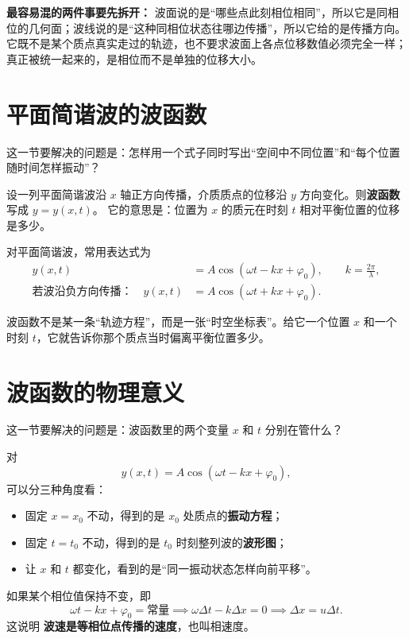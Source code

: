 \documentclass[lang=cn,11pt]{elegantbook}
\newcommand{\bridge}[1]{\begin{note}#1\end{note}}
\begin{document}
\begin{note}
\textbf{最容易混的两件事要先拆开：} 波面说的是“哪些点此刻相位相同”，所以它是同相位的几何面；波线说的是“这种同相位状态往哪边传播”，所以它给的是传播方向。它既不是某个质点真实走过的轨迹，也不要求波面上各点位移数值必须完全一样；真正被统一起来的，是相位而不是单独的位移大小。
\end{note}

\section{平面简谐波的波函数}

这一节要解决的问题是：怎样用一个式子同时写出“空间中不同位置”和“每个位置随时间怎样振动”？

设一列平面简谐波沿 \(x\) 轴正方向传播，介质质点的位移沿 \(y\) 方向变化。则\textbf{波函数}写成 \(y=y(x,t)\)。
它的意思是：位置为 \(x\) 的质元在时刻 \(t\) 相对平衡位置的位移是多少。

对平面简谐波，常用表达式为
\[
\begin{aligned}
y(x,t)&=A\cos(\omega t-kx+\varphi_0),\qquad k=\frac{2\pi}{\lambda},\\
\text{若波沿负方向传播：}\quad
y(x,t)&=A\cos(\omega t+kx+\varphi_0).
\end{aligned}
\]

\bridge{波函数不是某一条“轨迹方程”，而是一张“时空坐标表”。给它一个位置 \(x\) 和一个时刻 \(t\)，它就告诉你那个质点当时偏离平衡位置多少。}

\section{波函数的物理意义}

这一节要解决的问题是：波函数里的两个变量 \(x\) 和 \(t\) 分别在管什么？

对
\[
y(x,t)=A\cos(\omega t-kx+\varphi_0),
\]
可以分三种角度看：
\begin{itemize}
  \item 固定 \(x=x_0\) 不动，得到的是 \(x_0\) 处质点的\textbf{振动方程}；
  \item 固定 \(t=t_0\) 不动，得到的是 \(t_0\) 时刻整列波的\textbf{波形图}；
  \item 让 \(x\) 和 \(t\) 都变化，看到的是“同一振动状态怎样向前平移”。
\end{itemize}

如果某个相位值保持不变，即
\[
\omega t-kx+\varphi_0=\text{常量}
\implies \omega\Delta t-k\Delta x=0
\implies \Delta x=u\Delta t.
\]
这说明 \textbf{波速是等相位点传播的速度}，也叫相速度。
\end{document}
